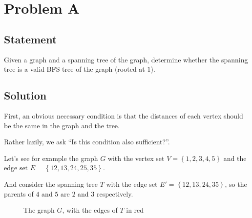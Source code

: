 \section{Problem A}
    \subsection{Statement}
        Given a graph and a spanning tree of the graph, determine whether the spanning tree is a valid BFS
        tree of the graph (rooted at $1$).

    \subsection{Solution}
        First, an obvious necessary condition is that the distances of each vertex should be the same in the graph
        and the tree.

        Rather lazily, we ask ``Is this condition also sufficient?''.

        Let's see for example the graph $G$ with the vertex set
        $V = \left\{1, 2, 3, 4, 5\right\}$ and the edge set 
        $E = \left\{12, 13, 24, 25, 35\right\}$.

        And consider the spanning tree $T$ with the edge set
        $E' = \left\{12, 13, 24, 35\right\}$, so the parents
        of $4$ and $5$ are $2$ and $3$ respectively.

        \begin{figure}[h]
        \centering
        \caption{The graph $G$, with the edges of $T$ in red} \label{fig:naive}
        \end{figure}

